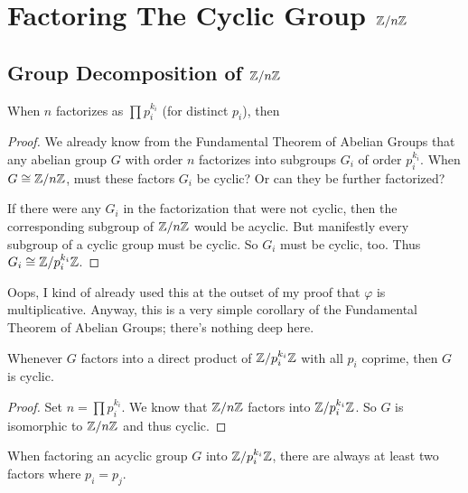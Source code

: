 \section{Factoring The Cyclic Group $\mathbb{Z} / n\mathbb{Z}$}

\subsection{Group Decomposition of $\mathbb{Z} / n\mathbb{Z}$}

\begin{theorem}
  When $n$ factorizes as $\prod p_i^{k_i}$ (for distinct $p_i$), then

  \begin{nedqn}
    \Zmodn
  \congcol
    \times
    \cdots
    \times
  \end{nedqn}
\end{theorem}

\begin{proof}
  We already know from the Fundamental Theorem of Abelian Groups that
  any abelian group $G$ with order $n$ factorizes into subgroups $G_i$
  of order $p_i^{k_i}$.  When $G \cong \mathbb{Z} / n\mathbb{Z}$, must these factors $G_i$
  be cyclic? Or can they be further factorized?

  If there were any $G_i$ in the factorization that were not cyclic,
  then the corresponding subgroup of $\mathbb{Z} / n\mathbb{Z}$ would be acyclic. But
  manifestly every subgroup of a cyclic group must be cyclic. So $G_i$
  must be cyclic, too. Thus $G_i \cong \mathbb{Z} / p_i^{k_i}\mathbb{Z}$.
\end{proof}

\begin{remark}
  Oops, I kind of already used this at the outset of my proof that
  $\varphi$ is multiplicative. Anyway, this is a very simple corollary
  of the Fundamental Theorem of Abelian Groups; there's nothing deep
  here.
\end{remark}

\begin{corollary}
  Whenever $G$ factors into a direct product of $\mathbb{Z} / p_i^{k_i}\mathbb{Z}$ with
  all $p_i$ coprime, then $G$ is cyclic.
\end{corollary}

\begin{proof}
  Set $n = \prod p_i^{k_i}$. We know that $\mathbb{Z} / n\mathbb{Z}$ factors into
  $\mathbb{Z} / p_i^{k_i}\mathbb{Z}$. So $G$ is isomorphic to $\mathbb{Z} / n\mathbb{Z}$ and thus cyclic.
\end{proof}

\begin{corollary}
  When factoring an acyclic group $G$ into $\mathbb{Z} / p_i^{k_i}\mathbb{Z}$, there are
  always at least two factors where $p_i = p_j$.
\end{corollary}

